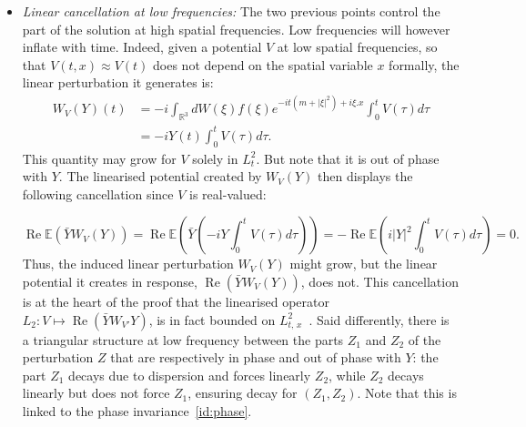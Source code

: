 \documentclass[10pt]{amsart}
\theoremstyle{definition}\newtheorem{defi}[theo]{Definition}\newtheorem{rema}[theo]{Remark}\newtheorem{exam}[theo]{Example}\newtheorem{exem}[theo]{Example}\newtheorem{nota}[theo]{Notation}
\newcommand{\R}{\mathbb{R}}
\newcommand{\E}{\mathbb{E}}
\DeclareMathOperator{\Rel}{Re}
\begin{document}
\begin{itemize}
\item \emph{Linear cancellation at low frequencies:} The two previous points control the part of the solution at high spatial frequencies. Low frequencies will however inflate with time. Indeed, given a potential $V$ at low spatial frequencies, so that $V(t,x)\approx V(t)$ does not depend on the spatial variable $x$ formally, the linear perturbation it generates is:
\begin{equation} \label{id:formalcomputlowfreq}
\begin{split}
W_V (Y)(t) &=-i \int_{\R^3} dW(\xi) f(\xi) e^{-it\left(m+ |\xi|^2\right)+i\xi.x} \int_{0}^t V(\tau)d\tau \\
&=-iY(t)\int_0^t V(\tau)d\tau.
\end{split}
\end{equation}
This quantity may grow for $V$ solely in $L^2_t$. But note that it is out of phase with $Y$. The linearised potential created by $W_V (Y)$ then displays the following cancellation since $V$ is real-valued:

\[
\Rel \E \left(\bar YW_V (Y)\right)= \Rel \E \left(\bar Y \left(-iY\int_0^t V(\tau)d\tau \right)\right)=- \Rel \E \left(i |Y|^2\int_0^t V(\tau)d\tau \right)=0.
\]
Thus, the induced linear perturbation $W_V (Y)$ might grow, but the linear potential it creates in response, $\Rel (\bar Y W_V (Y))$, does not. This cancellation is at the heart of the proof that the linearised operator $L_2:V\mapsto \Rel (\bar Y W_{V'} Y)$, is in fact bounded on $L^2_{t,\,x}$~\cite{lewsab2}. Said differently, there is a triangular structure at low frequency between the parts $Z_1$ and $Z_2$ of the perturbation $Z$ that are respectively in phase and out of phase with $Y$: the part $Z_1$ decays due to dispersion and forces linearly $Z_2$, while $Z_2$ decays linearly but does not force $Z_1$, ensuring decay for $(Z_1,Z_2)$. Note that this is linked to the phase invariance~\eqref{id:phase}.


\end{itemize}
\end{document}

